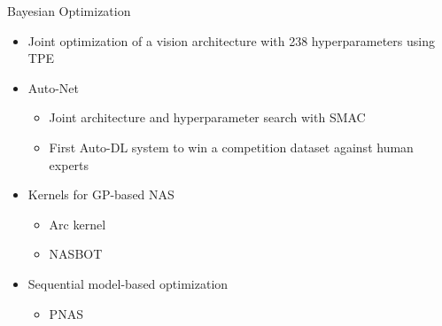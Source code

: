 \begin{frame}[c]{Bayesian Optimization}
\begin{itemize}
	\item \alert{Joint optimization of a vision architecture} with 238 hyperparameters 
	using TPE 
	\item \alert{Auto-Net}
	\begin{itemize}
		\item Joint architecture and hyperparameter search with SMAC
		\item First Auto-DL system to win a competition dataset 
		against human experts 
	\end{itemize}
	\item \alert{Kernels for GP-based NAS}
	\begin{itemize}
		\item Arc kernel 
		\item NASBOT 
	\end{itemize}
	\item \alert{Sequential model-based optimization}
	\begin{itemize}
		\item PNAS 
	\end{itemize}
\end{itemize}

\end{frame}


